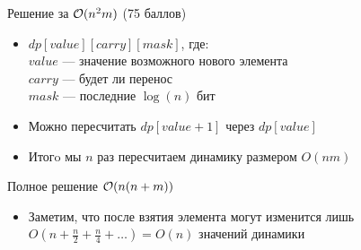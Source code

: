 \begin{frame}{Решение за $\mathcal{O}(n^2m)$ (75 баллов)}
  \begin{itemize}
  \item $dp[value][carry][mask]$, где:\\
  \indent $value$ --- значение возможного нового элемента\\
  \indent $carry$ --- будет ли перенос\\
  \indent $mask$ --- последние $\log(n)$ бит\\
  \item Можно пересчитать $dp[value + 1]$ через $dp[value]$
  \item Итогo мы $n$ раз пересчитаем динамику размером $O(nm)$
  \end{itemize}
\end{frame}

\begin{frame}{Полное решение $\mathcal{O}(n(n + m))$}
  \begin{itemize}
  \item Заметим, что после взятия элемента могут изменится лишь $O(n + \frac{n}{2} + \frac{n}{4} + \ldots) = O(n)$ значений динамики
  \end{itemize}
\end{frame}
